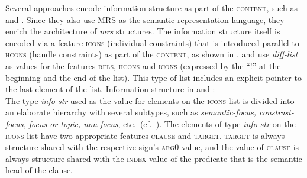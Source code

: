 \documentclass[output=paper
	        ,collection
	        ,collectionchapter
 	        ,biblatex
                ,babelshorthands
                ,newtxmath
                ,draftmode
                ,colorlinks, citecolor=brown
]{langscibook}
\begin{document}
Several approaches encode information structure as part of the \textsc{content},
such as \cite{song2018} and \cite{song-bender:2012}. Since they also
use MRS as the semantic representation language, they enrich the
architecture of \textit{mrs} structures. The information structure
itself is encoded via a feature  \textsc{icons} (individual
constraints) that is introduced parallel to  \textsc{hcons} (handle
constraints) as part of the \textsc{content}, as shown in
. \cite{song2018} and \cite{song-bender:2012}
use  \textit{diff-list} as values for the features \textsc{rels, hcons}
and \textsc{icons} (expressed by the ``!'' at the beginning and the
end of the list). This type of list includes an explicit pointer
to the last element of the list.
\ea\label{fig:song-infostruc}
Information structure in \cite{song-bender:2012} and \cite[116]{song2018}:\\
\z
The type  \textit{info-str} used as the value for elements on the
\textsc{icons} list is divided into an elaborate hierarchy with
several subtypes, such as \textit{semantic-focus, constrast-focus,
  focus-or-topic, non-focus}, etc.\ (cf.~\citealt[114]{song2018}). The
elements of type \textit{info-str} on the \textsc{icons} list have two
appropriate features \textsc{clause} and \textsc{target}. \textsc{target} is
always structure-shared with the respective sign's \textsc{arg0} value, and
the value of \textsc{clause} is always structure-shared with the
\textsc{index} value of the predicate that is the semantic head of the
clause.
\end{document}

